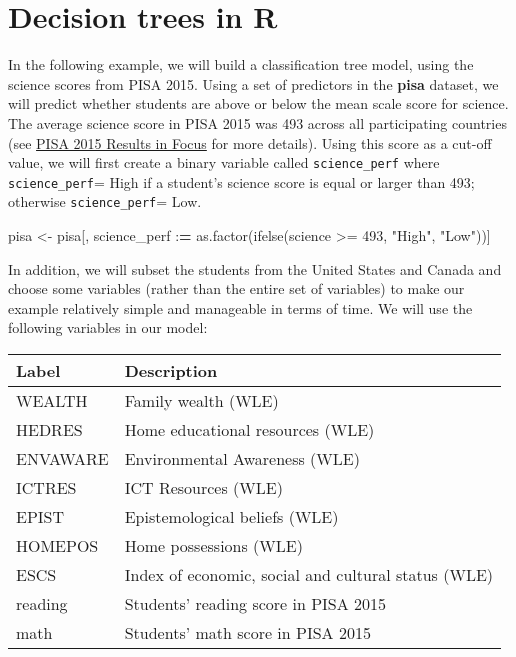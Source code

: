 \documentclass[
]{book}
\newenvironment{Shaded}{\begin{snugshade}}{\end{snugshade}}
\newcommand{\DecValTok}[1]{\textcolor[rgb]{0.00,0.00,0.81}{#1}}
\newcommand{\ErrorTok}[1]{\textcolor[rgb]{0.64,0.00,0.00}{\textbf{#1}}}
\newcommand{\FunctionTok}[1]{\textcolor[rgb]{0.00,0.00,0.00}{#1}}
\newcommand{\NormalTok}[1]{#1}
\newcommand{\OtherTok}[1]{\textcolor[rgb]{0.56,0.35,0.01}{#1}}
\newcommand{\SpecialCharTok}[1]{\textcolor[rgb]{0.00,0.00,0.00}{#1}}
\newcommand{\StringTok}[1]{\textcolor[rgb]{0.31,0.60,0.02}{#1}}
\begin{document}
\hypertarget{decision-trees-in-r}{%
\section{Decision trees in R}\label{decision-trees-in-r}}

In the following example, we will build a classification tree model, using the science scores from PISA 2015. Using a set of predictors in the \textbf{pisa} dataset, we will predict whether students are above or below the mean scale score for science. The average science score in PISA 2015 was 493 across all participating countries (see \href{https://www.oecd.org/pisa/pisa-2015-results-in-focus.pdf}{PISA 2015 Results in Focus} for more details). Using this score as a cut-off value, we will first create a binary variable called \texttt{science\_perf} where \texttt{science\_perf}= High if a student's science score is equal or larger than 493; otherwise \texttt{science\_perf}= Low.

\begin{Shaded}
\begin{Highlighting}[]
\NormalTok{pisa }\OtherTok{\textless{}{-}}\NormalTok{ pisa[, science\_perf }\SpecialCharTok{:}\ErrorTok{=} \FunctionTok{as.factor}\NormalTok{(}\FunctionTok{ifelse}\NormalTok{(science }\SpecialCharTok{\textgreater{}=} \DecValTok{493}\NormalTok{, }\StringTok{"High"}\NormalTok{, }\StringTok{"Low"}\NormalTok{))]}
\end{Highlighting}
\end{Shaded}

In addition, we will subset the students from the United States and Canada and choose some variables (rather than the entire set of variables) to make our example relatively simple and manageable in terms of time. We will use the following variables in our model:

\begin{longtable}[]{@{}ll@{}}
\toprule
Label & Description\tabularnewline
\midrule
\endhead
WEALTH & Family wealth (WLE)\tabularnewline
HEDRES & Home educational resources (WLE)\tabularnewline
ENVAWARE & Environmental Awareness (WLE)\tabularnewline
ICTRES & ICT Resources (WLE)\tabularnewline
EPIST & Epistemological beliefs (WLE)\tabularnewline
HOMEPOS & Home possessions (WLE)\tabularnewline
ESCS & Index of economic, social and cultural status (WLE)\tabularnewline
reading & Students' reading score in PISA 2015\tabularnewline
math & Students' math score in PISA 2015\tabularnewline
\bottomrule
\end{longtable}
\end{document}
